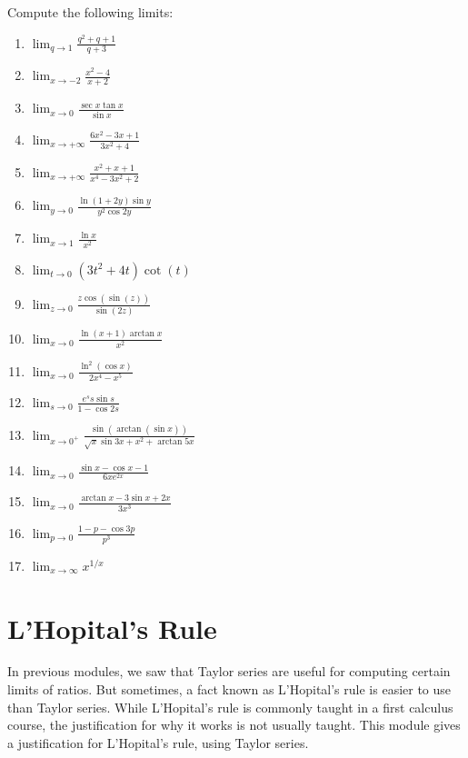 \documentclass[twoside,openright,titlepage,a4paper]{book}
\begin{document}
\begin{sloppypar}
Compute the following limits:
\begin{enumerate}
\item $ \displaystyle \lim_{q \to 1} \frac{q^2 + q + 1}{q+3} $
\item $ \displaystyle \lim_{x \to -2} \frac {x^2-4}{x+2} $
\item $ \displaystyle \lim_{x \to 0} \frac{\sec x\tan x}{\sin x} $
\item $ \displaystyle \lim_{x \to +\infty} \frac{6x^2 -3x+1}{3x^2+4} $
\item $ \displaystyle \lim_{x \rightarrow +\infty} \frac {x^2+x+1}{x^4-3x^2+2} $
\item $ \displaystyle \lim_{y \to 0} \frac{\ln(1+2y)\sin y}{y^2\cos 2y} $
\item $ \displaystyle \lim_{x\to 1} \frac{\ln x}{x^2} $
\item $ \displaystyle \lim_{t\to 0} (3t^2+4t)\cot(t) $
\item $ \displaystyle \lim_{z\to 0} \frac{z\cos(\sin(z))}{\sin(2z)} $
\item $ \displaystyle \lim_{x \to 0} \frac{\ln (x+1)\arctan x}{x^2} $
\item $ \displaystyle \lim_{x \to 0} \frac{\ln^2(\cos x)}{2x^4-x^5} $
\item $ \displaystyle \lim_{s \to 0} \frac{e^s s \sin s}{1 - \cos 2s} $
\item $ \displaystyle \lim_{x \to 0^+} \frac{\sin(\arctan(\sin x))}{\sqrt{x} \sin 3x +x^2+ \arctan 5x} $
\item $ \displaystyle \lim_{x \to 0} \frac{\sin x -\cos x -1}{6x e^{2x}} $
\item $ \displaystyle \lim_{x \to 0} \frac{\arctan x-3 \sin x +2x}{3x^3} $
\item $ \displaystyle \lim_{p \to 0} \frac{1-p- \cos 3p}{p^3} $
\item $ \displaystyle \lim_{x \to \infty} x^{1/x} $
\end{enumerate}

\section{L'Hopital's Rule} \label{ChFunctionsSecLHopitalsRule}

In previous modules, we saw that Taylor series are useful for computing certain limits of ratios. But sometimes, a fact known as L'Hopital's rule is easier to use than Taylor series. While L'Hopital's rule is commonly taught in a first calculus course, the justification for why it works is not usually taught. This module gives a justification for L'Hopital's rule, using Taylor series.


\end{sloppypar}
\end{document}
